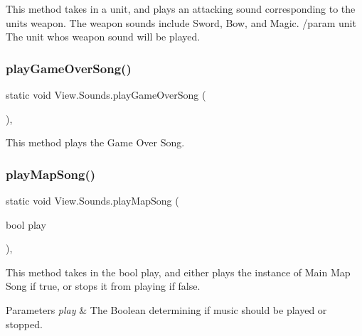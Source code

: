 This method takes in a unit, and plays an attacking sound corresponding to the unit\textquotesingle{}s weapon. The weapon sounds include Sword, Bow, and Magic. /param unit The unit who\textquotesingle{}s weapon sound will be played. \hypertarget{class_view_1_1_sounds_ada712efeff25692ef207a76d1833dad1}{}\label{class_view_1_1_sounds_ada712efeff25692ef207a76d1833dad1} 
\subsubsection{\texorpdfstring{play\+Game\+Over\+Song()}{playGameOverSong()}}
{\footnotesize\ttfamily static void View.\+Sounds.\+play\+Game\+Over\+Song (\begin{DoxyParamCaption}{ }\end{DoxyParamCaption})\hspace{0.3cm}{\ttfamily [inline]}, {\ttfamily [static]}}

This method plays the Game Over Song. \hypertarget{class_view_1_1_sounds_a00111a18d755859f6c1e7e619cedd636}{}\label{class_view_1_1_sounds_a00111a18d755859f6c1e7e619cedd636} 
\subsubsection{\texorpdfstring{play\+Map\+Song()}{playMapSong()}}
{\footnotesize\ttfamily static void View.\+Sounds.\+play\+Map\+Song (\begin{DoxyParamCaption}\item[{bool}]{play }\end{DoxyParamCaption})\hspace{0.3cm}{\ttfamily [inline]}, {\ttfamily [static]}}

This method takes in the bool play, and either plays the instance of Main Map Song if true, or stops it from playing if false. 
\begin{DoxyParams}{Parameters}
{\em play} & The Boolean determining if music should be played or stopped. \\
\hline
\end{DoxyParams}
\hypertarget{class_view_1_1_sounds_a375e38c529895c398a8b96bd358bcabc}{}\label{class_view_1_1_sounds_a375e38c529895c398a8b96bd358bcabc} 
